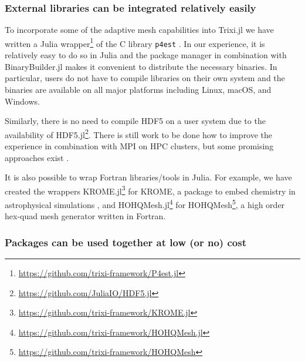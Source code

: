 \documentclass{juliacon}
\newcommand{\trixi}{Trixi.jl\xspace}
\begin{document}
\subsubsection{External libraries can be integrated relatively easily}

To incorporate some of the adaptive mesh capabilities into \trixi
we have written a Julia wrapper\footnote{\url{https://github.com/trixi-framework/P4est.jl}}
of the C library \texttt{p4est} \cite{burstedde2011p4est}. In our experience,
it is relatively easy to do so in Julia and the package manager in combination
with BinaryBuilder.jl makes it convenient to distribute the necessary binaries.
In particular, users do not have to compile libraries on their own system
and the binaries are available on all major platforms including Linux, macOS,
and Windows.

Similarly, there is no need to compile HDF5 on a user system due to the
availability of HDF5.jl\footnote{\url{https://github.com/JuliaIO/HDF5.jl}}.
There is still work to be done how to improve the experience in combination
with MPI on HPC clusters, but some promising
approaches exist \cite{byrne2021mpi}.

It is also possible to wrap Fortran libraries/tools in Julia. For example, we
have created the wrappers KROME.jl\footnote{\url{https://github.com/trixi-framework/KROME.jl}}
for KROME, a package to embed chemistry in astrophysical simulations
\cite{grassi2014krome}, and HOHQMesh.jl\footnote{\url{https://github.com/trixi-framework/HOHQMesh.jl}}
for HOHQMesh\footnote{\url{https://github.com/trixi-framework/HOHQMesh}}, a high order
hex-quad mesh generator written in Fortran.

\subsubsection{Packages can be used together at low (or no) cost}
\end{document}
